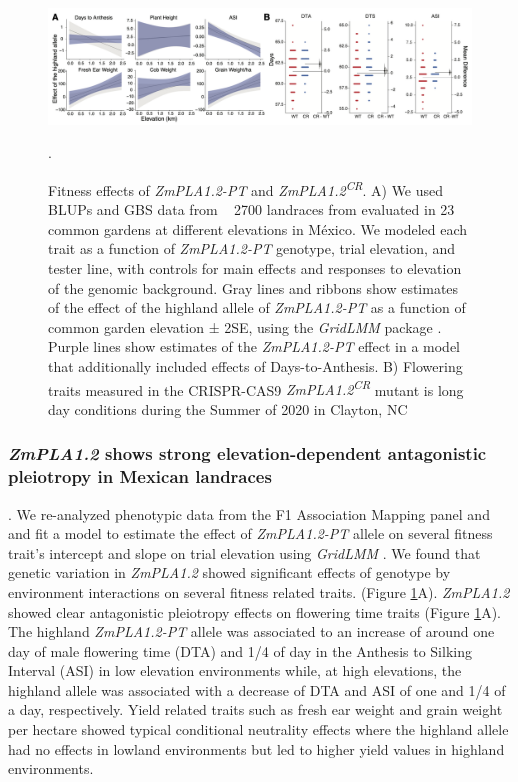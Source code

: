 \documentclass[9pt,twocolumn,twoside,lineno]{BioRxiv}
\begin{document}
\begin{figure}[!ht]
\begin{center}
\includegraphics[width=0.8\paperwidth]{Figures/Fig_6.png}
\caption{Fitness effects of \textit{ZmPLA1.2-PT} and \textit{ZmPLA1.2\textsuperscript{CR}}. 
A) We used BLUPs and GBS data from ~ 2700 landraces from \cite{Gates2019-xu} evaluated in 23 common gardens at different elevations in México. 
We modeled each trait as a function of \textit{ZmPLA1.2-PT} genotype, trial elevation, and tester line, with controls for main effects and responses to elevation of the genomic background. 
Gray lines and ribbons show estimates of the effect of the highland allele of \textit{ZmPLA1.2-PT} as a function of common garden elevation ± 2SE, using the \textit{GridLMM} package \cite{Runcie2019-Gr}. 
Purple lines show estimates of the \textit{ZmPLA1.2-PT} effect in a model that additionally included effects of Days-to-Anthesis.
B) Flowering traits measured in the CRISPR-CAS9 \textit{ZmPLA1.2\textsuperscript{CR}} mutant is long day conditions during the Summer of 2020 in Clayton, NC}. 
\label{Fig6}
\end{center}
\end{figure}
\subsubsection{\textit{ZmPLA1.2} shows strong elevation-dependent antagonistic pleiotropy in Mexican landraces}. 
We re-analyzed phenotypic data from the F1 Association Mapping panel \cite{Romero_Navarro2017-cn} and \cite{Gates2019-xu} and fit a model to estimate the effect of \textit{ZmPLA1.2-PT} allele on several fitness trait's intercept and slope on trial elevation using \textit{GridLMM} \cite{Runcie2019-Gr}. 
We found that genetic variation in \textit{ZmPLA1.2} showed significant effects of genotype by environment interactions on several fitness related traits. (Figure \ref{Fig6}A). 
\textit{ZmPLA1.2} showed clear antagonistic pleiotropy effects on flowering time traits (Figure \ref{Fig6}A). 
The highland \textit{ZmPLA1.2-PT} allele was associated to an increase of around one day of male flowering time (DTA)  and 1/4 of day in the  Anthesis to Silking Interval (ASI) in low elevation environments while, at high elevations, the highland allele was associated with a decrease of DTA and ASI of one and 1/4 of a day, respectively.
Yield related traits such as fresh ear weight and grain weight per hectare showed typical conditional neutrality effects where the highland allele had no effects in lowland environments but led to higher yield values in highland environments.
\end{document}
